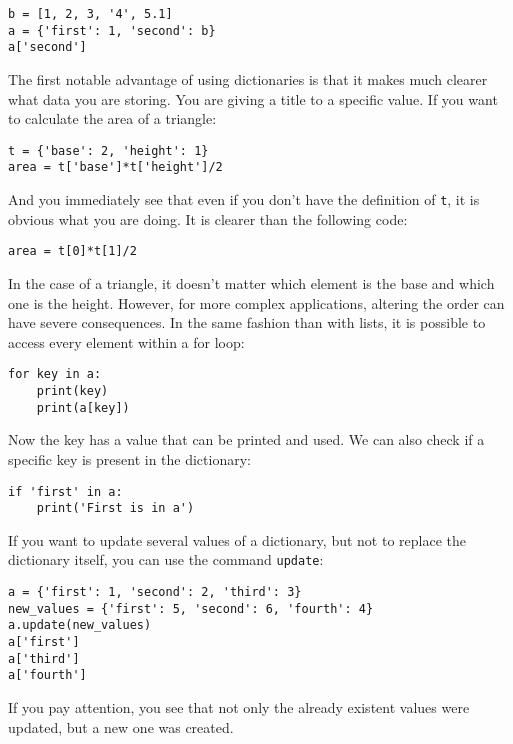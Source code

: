 \begin{verbatim}
b = [1, 2, 3, '4', 5.1]
a = {'first': 1, 'second': b}
a['second']
\end{verbatim}

The first notable advantage of using dictionaries is that it makes much clearer what data you are storing. You are giving a title to a specific value. If you want to calculate the area of a triangle:

\begin{verbatim}
t = {'base': 2, 'height': 1}
area = t['base']*t['height']/2
\end{verbatim}

And you immediately see that even if you don't have the definition of \texttt{t}, it is obvious what you are doing. It is clearer than the following code:

\begin{verbatim}
area = t[0]*t[1]/2
\end{verbatim}

In the case of a triangle, it doesn't matter which element is the base and which one is the height. However, for more complex applications, altering the order can have severe consequences. In the same fashion than with lists, it is possible to access every element within a for loop:

\begin{verbatim}
for key in a:
    print(key)
    print(a[key])
\end{verbatim}

Now the key has a value that can be printed and used. We can also check if a specific key is present in the dictionary:

\begin{verbatim}
if 'first' in a:
    print('First is in a')
\end{verbatim}

If you want to update several values of a dictionary, but not to replace the dictionary itself, you can use the command \texttt{update}:

\begin{verbatim}
a = {'first': 1, 'second': 2, 'third': 3}
new_values = {'first': 5, 'second': 6, 'fourth': 4}
a.update(new_values)
a['first']
a['third']
a['fourth']
\end{verbatim}

If you pay attention, you see that not only the already existent values were updated, but a new one was created.

